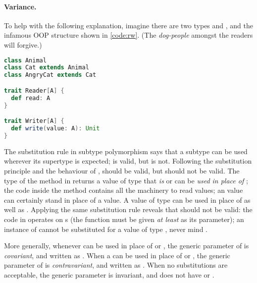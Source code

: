 \documentclass[10 pt]{article}
\begin{document}
\paragraph{Variance.} To help with the following explanation, imagine there are two types  and , and the infamous OOP structure shown in \autoref{code:rw}. (The \emph{dog-people} amongst the readers will forgive.)

\begin{lstlisting}[caption={Reader and Writer}, label={code:rw}, language=Scala, escapechar=|]
class Animal
class Cat extends Animal
class AngryCat extends Cat

trait Reader[A] {
  def read: A
}

trait Writer[A] {
  def write(value: A): Unit
}
\end{lstlisting}

The substitution rule in subtype polymorphism says that a subtype can be used wherever its supertype is expected;  is valid, but  is not. Following the substitution principle and the behaviour of ,  should be valid, but  should not be valid. The type of the  method in  returns a value of type that \emph{is} or can be \emph{used in place of} ; the code inside the \break {} method contains all the machinery to read  values; an  value can certainly stand in place of a  value. A value of type  can be used in place of  as well as . Applying the same substitution rule reveals that  should not be valid: the code in  operates on s (the  function must be given \emph{at least}  as its parameter); an instance of  cannot be substituted for a value of type , never mind \break {}. 

More generally, whenever  can be used in place of  or , the generic parameter of  is \emph{covariant}, and written as . When a  can be used in place of  or , the generic parameter of  is \emph{contravariant}, and written as . When no substitutions are acceptable, the generic parameter is invariant, and does not have \pcode{+} or \pcode{-}. 
\end{document}
